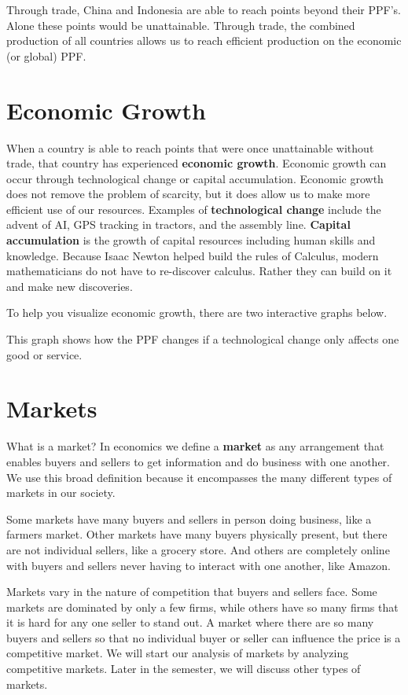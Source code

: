 \documentclass[
]{book}
\begin{document}
Through trade, China and Indonesia are able to reach points beyond their PPF's. Alone these points would be unattainable. Through trade, the combined production of all countries allows us to reach efficient production on the economic (or global) PPF.

\section{Economic Growth}\label{economic-growth}

When a country is able to reach points that were once unattainable without trade, that country has experienced \textbf{economic growth}. Economic growth can occur through technological change or capital accumulation. Economic growth does not remove the problem of scarcity, but it does allow us to make more efficient use of our resources. Examples of \textbf{technological change} include the advent of AI, GPS tracking in tractors, and the assembly line. \textbf{Capital accumulation} is the growth of capital resources including human skills and knowledge. Because Isaac Newton helped build the rules of Calculus, modern mathematicians do not have to re-discover calculus. Rather they can build on it and make new discoveries.

To help you visualize economic growth, there are two interactive graphs below.

This graph shows how the PPF changes if a technological change only affects one good or service.

\section{Markets}\label{markets}

What is a market? In economics we define a \textbf{market} as any arrangement that enables buyers and sellers to get information and do business with one another. We use this broad definition because it encompasses the many different types of markets in our society.

Some markets have many buyers and sellers in person doing business, like a farmers market. Other markets have many buyers physically present, but there are not individual sellers, like a grocery store. And others are completely online with buyers and sellers never having to interact with one another, like Amazon.

Markets vary in the nature of competition that buyers and sellers face. Some markets are dominated by only a few firms, while others have so many firms that it is hard for any one seller to stand out. A market where there are so many buyers and sellers so that no individual buyer or seller can influence the price is a competitive market. We will start our analysis of markets by analyzing competitive markets. Later in the semester, we will discuss other types of markets.
\end{document}
